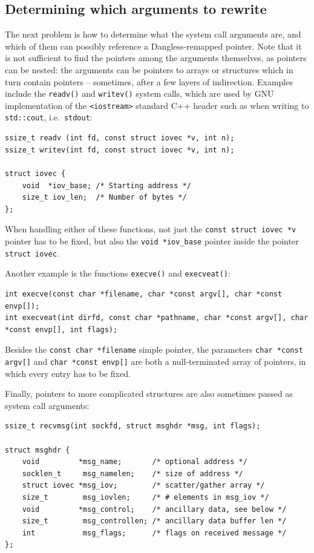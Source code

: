 \subsection{Determining which arguments to rewrite}

The next problem is how to determine what the system call arguments are, and which of them can possibly reference a Dangless-remapped pointer. Note that it is not sufficient to find the pointers among the arguments themselves, as pointers can be nested: the arguments can be pointers to arrays or structures which in turn contain pointers -- sometimes, after a few layers of indirection. Examples include the \lstinline!readv()! and \lstinline!writev()! system calls, which are used by GNU implementation of the \lstinline!<iostream>! standard C++ header such as when writing to \lstinline!std::cout!, i.e.\ \lstinline!stdout!:

\begin{lstlisting}
ssize_t readv (int fd, const struct iovec *v, int n);
ssize_t writev(int fd, const struct iovec *v, int n);

struct iovec {
	void  *iov_base; /* Starting address */
	size_t iov_len;  /* Number of bytes */
};
\end{lstlisting}

When handling either of these functions, not just the \lstinline!const struct iovec *v! pointer has to be fixed, but also the \lstinline!void *iov_base! pointer inside the pointer \lstinline!struct iovec!.

Another example is the functions \lstinline!execve()! and \lstinline!execveat()!:

\begin{lstlisting}
int execve(const char *filename, char *const argv[], char *const envp[]);
int execveat(int dirfd, const char *pathname, char *const argv[], char *const envp[], int flags);
\end{lstlisting}

Besides the \lstinline!const char *filename! simple pointer, the parameters \lstinline!char *const argv[]! and \lstinline!char *const envp[]! are both a null-terminated array of pointers, in which every entry has to be fixed.

Finally, pointers to more complicated structures are also sometimes passed as system call arguments:

\begin{lstlisting}
ssize_t recvmsg(int sockfd, struct msghdr *msg, int flags);

struct msghdr {
	void         *msg_name;       /* optional address */
	socklen_t     msg_namelen;    /* size of address */
	struct iovec *msg_iov;        /* scatter/gather array */
	size_t        msg_iovlen;     /* # elements in msg_iov */
	void         *msg_control;    /* ancillary data, see below */
	size_t        msg_controllen; /* ancillary data buffer len */
	int           msg_flags;      /* flags on received message */
};
\end{lstlisting}

